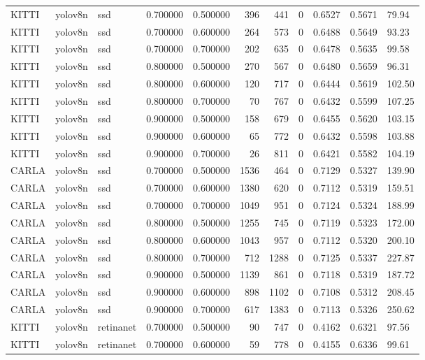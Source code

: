 \begin{tabular}{lllrrrrrlll}
KITTI & yolov8n & ssd & 0.700000 & 0.500000 & 396 & 441 & 0 & 0.6527 & 0.5671 & 79.94 \\
KITTI & yolov8n & ssd & 0.700000 & 0.600000 & 264 & 573 & 0 & 0.6488 & 0.5649 & 93.23 \\
KITTI & yolov8n & ssd & 0.700000 & 0.700000 & 202 & 635 & 0 & 0.6478 & 0.5635 & 99.58 \\
KITTI & yolov8n & ssd & 0.800000 & 0.500000 & 270 & 567 & 0 & 0.6480 & 0.5659 & 96.31 \\
KITTI & yolov8n & ssd & 0.800000 & 0.600000 & 120 & 717 & 0 & 0.6444 & 0.5619 & 102.50 \\
KITTI & yolov8n & ssd & 0.800000 & 0.700000 & 70 & 767 & 0 & 0.6432 & 0.5599 & 107.25 \\
KITTI & yolov8n & ssd & 0.900000 & 0.500000 & 158 & 679 & 0 & 0.6455 & 0.5620 & 103.15 \\
KITTI & yolov8n & ssd & 0.900000 & 0.600000 & 65 & 772 & 0 & 0.6432 & 0.5598 & 103.88 \\
KITTI & yolov8n & ssd & 0.900000 & 0.700000 & 26 & 811 & 0 & 0.6421 & 0.5582 & 104.19 \\
CARLA & yolov8n & ssd & 0.700000 & 0.500000 & 1536 & 464 & 0 & 0.7129 & 0.5327 & 139.90 \\
CARLA & yolov8n & ssd & 0.700000 & 0.600000 & 1380 & 620 & 0 & 0.7112 & 0.5319 & 159.51 \\
CARLA & yolov8n & ssd & 0.700000 & 0.700000 & 1049 & 951 & 0 & 0.7124 & 0.5324 & 188.99 \\
CARLA & yolov8n & ssd & 0.800000 & 0.500000 & 1255 & 745 & 0 & 0.7119 & 0.5323 & 172.00 \\
CARLA & yolov8n & ssd & 0.800000 & 0.600000 & 1043 & 957 & 0 & 0.7112 & 0.5320 & 200.10 \\
CARLA & yolov8n & ssd & 0.800000 & 0.700000 & 712 & 1288 & 0 & 0.7125 & 0.5337 & 227.87 \\
CARLA & yolov8n & ssd & 0.900000 & 0.500000 & 1139 & 861 & 0 & 0.7118 & 0.5319 & 187.72 \\
CARLA & yolov8n & ssd & 0.900000 & 0.600000 & 898 & 1102 & 0 & 0.7108 & 0.5312 & 208.45 \\
CARLA & yolov8n & ssd & 0.900000 & 0.700000 & 617 & 1383 & 0 & 0.7113 & 0.5326 & 250.62 \\
KITTI & yolov8n & retinanet & 0.700000 & 0.500000 & 90 & 747 & 0 & 0.4162 & 0.6321 & 97.56 \\
KITTI & yolov8n & retinanet & 0.700000 & 0.600000 & 59 & 778 & 0 & 0.4155 & 0.6336 & 99.61 \\

\end{tabular}
